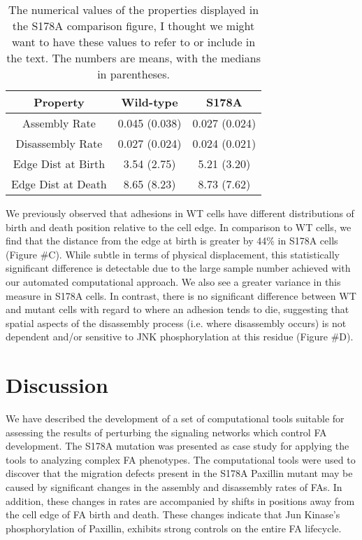 \documentclass[10pt]{article}
\begin{document}
\begin{table}
\begin{center}
\begin{tabular}[h]{c|c|c}
Property & Wild-type & S178A \\
\hline
Assembly Rate &0.045 (0.038) &0.027 (0.024)\\
Disassembly Rate &0.027 (0.024) &0.024 (0.021)\\
Edge Dist at Birth &3.54 (2.75) &5.21 (3.20)\\
Edge Dist at Death &8.65 (8.23) &8.73 (7.62)
\end{tabular}
\end{center}
\caption{The numerical values of the properties displayed in the S178A
comparison figure, I thought we might want to have these values to refer to or
include in the text. The numbers are means, with the medians in parentheses.}
\end{table}

We previously observed that adhesions in WT cells have different distributions
of birth and death position relative to the cell edge. In comparison to WT
cells, we find that the distance from the edge at birth is greater by 44\% in
S178A cells (Figure \#C). While subtle in terms of physical displacement, this
statistically significant difference is detectable due to the large sample
number achieved with our automated computational approach. We also see a greater
variance in this measure in S178A cells. In contrast, there is no significant
difference between WT and mutant cells with regard to where an adhesion tends to
die, suggesting that spatial aspects of the disassembly process (i.e. where
disassembly occurs) is not dependent and/or sensitive to JNK phosphorylation at
this residue (Figure \#D).



\section*{Discussion}

We have described the development of a set of computational tools suitable for
assessing the results of perturbing the signaling networks which control FA
development. The S178A mutation was presented as case study for applying the
tools to analyzing complex FA phenotypes. The computational tools were used to
discover that the migration defects present in the S178A Paxillin mutant may be
caused by significant changes in the assembly and disassembly rates of FAs. In
addition, these changes in rates are accompanied by shifts in positions away
from the cell edge of FA birth and death. These changes indicate that Jun
Kinase's phosphorylation of Paxillin, exhibits strong controls on the entire FA
lifecycle.
\end{document}
